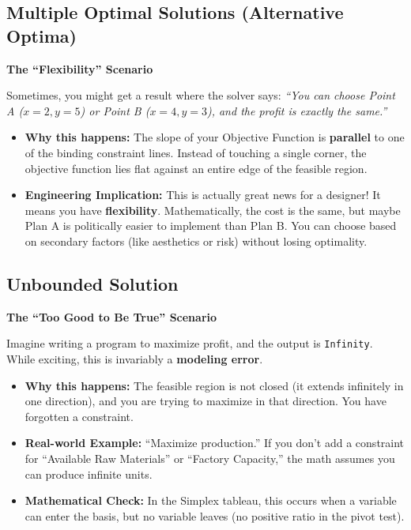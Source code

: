 \documentclass[
  letterpaper,
  DIV=11,
  numbers=noendperiod]{scrreprt}
\providecommand{\tightlist}{%
  \setlength{\itemsep}{0pt}\setlength{\parskip}{0pt}}
\begin{document}
\subsection{Multiple Optimal Solutions (Alternative
Optima)}\label{multiple-optimal-solutions-alternative-optima}

\textbf{The ``Flexibility'' Scenario}

Sometimes, you might get a result where the solver says: \emph{``You can
choose Point A (\(x=2, y=5\)) or Point B (\(x=4, y=3\)), and the profit
is exactly the same.''}

\begin{itemize}
\tightlist
\item
  \textbf{Why this happens:} The slope of your Objective Function is
  \textbf{parallel} to one of the binding constraint lines. Instead of
  touching a single corner, the objective function lies flat against an
  entire edge of the feasible region.
\item
  \textbf{Engineering Implication:} This is actually great news for a
  designer! It means you have \textbf{flexibility}. Mathematically, the
  cost is the same, but maybe Plan A is politically easier to implement
  than Plan B. You can choose based on secondary factors (like
  aesthetics or risk) without losing optimality.
\end{itemize}

\subsection{Unbounded Solution}\label{unbounded-solution}

\textbf{The ``Too Good to Be True'' Scenario}

Imagine writing a program to maximize profit, and the output is
\texttt{Infinity}. While exciting, this is invariably a \textbf{modeling
error}.

\begin{itemize}
\tightlist
\item
  \textbf{Why this happens:} The feasible region is not closed (it
  extends infinitely in one direction), and you are trying to maximize
  in that direction. You have forgotten a constraint.
\item
  \textbf{Real-world Example:} ``Maximize production.'' If you don't add
  a constraint for ``Available Raw Materials'' or ``Factory Capacity,''
  the math assumes you can produce infinite units.
\item
  \textbf{Mathematical Check:} In the Simplex tableau, this occurs when
  a variable can enter the basis, but no variable leaves (no positive
  ratio in the pivot test).
\end{itemize}
\end{document}
